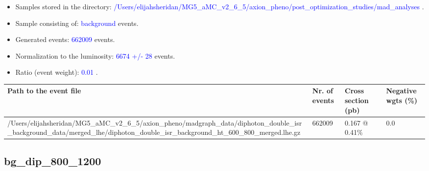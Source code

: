 \documentclass[a4paper, 10pt]{article}
\begin{document}
\begin{itemize}
  \item Samples stored in the directory: \textcolor{blue}{/\-Users/\-elijahsheridan/\-MG5\_aMC\_v2\_6\_5/\-axion\_pheno/\-post\_optimization\_studies/\-mad\_analyses} .
   \item Sample consisting of: \textcolor{blue}{background}  events.
   \item Generated events: \textcolor{blue}{662009 }  events.
   \item Normalization to the luminosity: \textcolor{blue}{6674}\textcolor{blue}{ +/\-- }\textcolor{blue}{28 }  events.
   \item Ratio (event weight): \textcolor{blue}{0.01 } .  
 
\end{itemize}
\begin{table}[H]
  \begin{center}
    \begin{tabular}{|m{55.0mm}|m{25.0mm}|m{30.0mm}|m{30.0mm}|}
      \hline
      {\cellcolor{yellow}         Path to the event file}& {\cellcolor{yellow}         Nr. of events}& {\cellcolor{yellow}         Cross section (pb)}& {\cellcolor{yellow}         Negative wgts (\%)}\\
      \hline
      {\cellcolor{white}          /\-Users/\-elijahsheridan/\-MG5\_aMC\_v2\_6\_5/\-axion\_pheno/\-madgraph\_data/\-diphoton\_double\_isr\_background\_data/\-merged\_lhe/\-diphoton\_double\_isr\_background\_ht\_600\_800\_merged.lhe.gz}& {\cellcolor{white}          662009}& {\cellcolor{white}          0.167 @ 0.41\%}& {\cellcolor{white}          0.0}\\
\hline
    \end{tabular}
  \end{center}
\end{table}

\subsection{ bg\_dip\_800\_1200}
\end{document}

